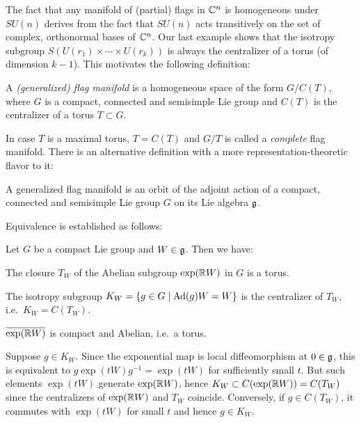 The fact that any manifold of (partial) flags in $\mathbb{C}^n$ is homogeneous under $SU(n)$ derives from the fact that $SU(n)$ acts transitively on the set of complex, orthonormal bases of $\mathbb{C}^n$. Our last example shows that the isotropy subgroup $S(U(r_1)\times\cdots \times U(r_k))$ is always the centralizer of a torus (of dimension $k-1$). This motivates the following definition:

\begin{mydef}
	A \emph{(generalized) flag manifold} is a homogeneous space of the form $G/C(T)$, where $G$ is a compact, connected and semisimple Lie group and $C(T)$ is the centralizer of a torus $T\subset G$.
\end{mydef}

In case $T$ is a maximal torus, $T=C(T)$ and $G/T$ is called a \emph{complete} flag manifold. There is an alternative definition with a more representation-theoretic flavor to it:

\begin{mydef}
	A generalized flag manifold is an orbit of the adjoint action of a compact, connected and semisimple Lie group $G$ on its Lie algebra $\mathfrak{g}$.
\end{mydef} 

Equivalence is established as follows:

\begin{prop}
	Let $G$ be a compact Lie group and $W\in \mathfrak{g}$. Then we have:
	\begin{numberedlist}
		\item The closure $T_W$ of the Abelian subgroup $\exp (\mathbb{R} W)$ in $G$ is a torus.
		\item The isotropy subgroup $K_W=\{g\in G\mid \operatorname{Ad}(g) W=W\}$ is the centralizer of $T_W$, i.e.~$K_W=C(T_W)$.
	\end{numberedlist}
\end{prop}

\begin{myproof}\leavevmode
	\begin{numberedlist}
		\item $\overline{\exp (\mathbb{R} W)}$ is compact and Abelian, i.e.~a torus.
		\item Suppose $g\in K_W$. Since the exponential map is local diffeomorphism at $0\in \mathfrak{g}$, this is equivalent to $g \exp(tW)g^{-1}=\exp(tW)$ for sufficiently small $t$. But such elements $\exp(tW)$ generate $\exp(\mathbb{R} W)$, hence $K_W\subset C(\exp(\mathbb{R} W))=C(T_W)$ since the centralizers of $\exp (\mathbb{R} W)$ and $T_W$ coincide. Conversely, if $g\in C(T_W)$, it commutes with $\exp(tW)$ for small $t$ and hence $g\in K_W$.\qedhere
	\end{numberedlist}
\end{myproof}

